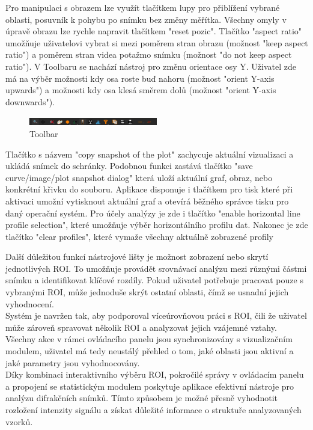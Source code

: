 \documentclass{article}
\begin{document}
Pro manipulaci s obrazem lze využít tlačítkem lupy pro přiblížení vybrané oblasti, posuvník k pohybu po snímku bez změny měřítka. Všechny omyly v úpravě obrazu lze rychle napravit tlačítkem "reset pozic". Tlačítko "aspect ratio" umožňuje uživatelovi vybrat si mezi poměrem stran obrazu (možnost "keep aspect  ratio") a poměrem stran videa potažmo snímku (možnost "do not keep aspect ratio"). V Toolbaru se nachází nástroj pro změnu orientace osy Y. Uživatel zde má na výběr možnosti kdy osa roste buď nahoru (možnost "orient Y-axis upwards") a možnosti kdy osa klesá směrem dolů (možnost "orient Y-axis downwards").\\
\begin{figure}[htp]
    \centering
    \includegraphics[width=0.5\textwidth]{images/Toolbar.png}
    \caption{Toolbar}
\end{figure}
Tlačítko s názvem "copy snapshot of the plot" zachycuje aktuální vizualizaci a ukládá snímek do schránky. Podobnou funkci zastává tlačítko "save curve/image/plot snapshot dialog" která uloží aktuální graf, obraz, nebo konkrétní křivku do souboru. Aplikace disponuje i tlačítkem pro tisk které při aktivaci umožní vytisknout aktuální graf a otevírá běžného správce tisku pro daný operační systém. Pro účely analýzy je zde i tlačítko "enable horizontal line profile selection", které umožňuje výběr horizontálního profilu dat. Nakonec je zde tlačítko "clear profiles", které vymaže všechny aktuálně zobrazené profily

Další důležitou funkcí nástrojové lišty je možnost zobrazení nebo skrytí jednotlivých ROI. To umožňuje provádět srovnávací analýzu mezi různými částmi snímku a identifikovat klíčové rozdíly. Pokud uživatel potřebuje pracovat pouze s vybranými ROI, může jednoduše skrýt ostatní oblasti, čímž se usnadní jejich vyhodnocení.\\

Systém je navržen tak, aby podporoval víceúrovňovou práci s ROI, čili že uživatel může zároveň spravovat několik ROI a analyzovat jejich vzájemné vztahy. Všechny akce v rámci ovládacího panelu jsou synchronizovány s vizualizačním modulem, uživatel má tedy neustálý přehled o tom, jaké oblasti jsou aktivní a jaké parametry jsou vyhodnocovány.\\

Díky kombinaci interaktivního výběru ROI, pokročilé správy v ovládacím panelu a propojení se statistickým modulem poskytuje aplikace efektivní nástroje pro analýzu difrakčních snímků. Tímto způsobem je možné přesně vyhodnotit rozložení intenzity signálu a získat důležité informace o struktuře analyzovaných vzorků.\\
\newpage
\end{document}
